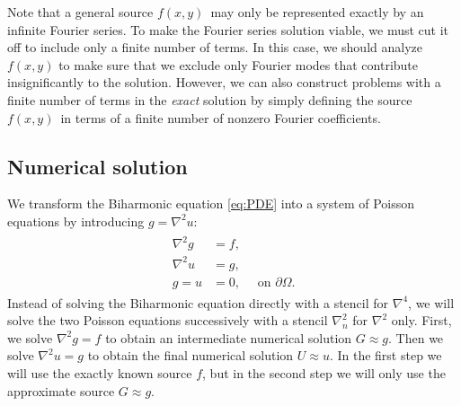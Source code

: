 Note that a general source $f(x,y)$ may only be represented exactly by an infinite Fourier series.
To make the Fourier series solution viable, we must cut it off to include only a finite number of terms.
In this case, we should analyze $f(x,y)$ to make sure that we exclude only Fourier modes that contribute insignificantly to the solution.
However, we can also construct problems with a finite number of terms in the \emph{exact} solution by simply defining the source $f(x,y)$ in terms of a finite number of nonzero Fourier coefficients.


\subsection{Numerical solution}
\label{sec:pde:numerical_solution}

We transform the Biharmonic equation \ref{eq:PDE} into a system of Poisson equations by introducing $g = \nabla^2 u$:
\begin{align}\label{eq:PDE-poisson}
  \begin{split}
    \nabla^2g &= f,\\
    \nabla^2u &= g,\\
    g = u &= 0,\quad \text{ on } \partial \Omega.
  \end{split}
\end{align}
Instead of solving the Biharmonic equation directly with a stencil for $\nabla^4$, we will solve the two Poisson equations successively with a stencil $\nabla_n^2$ for $\nabla^2$ only.
First, we solve $\nabla^2 g = f$ to obtain an intermediate numerical solution $G \approx g$.
Then we solve $\nabla^2 u = g$ to obtain the final numerical solution $U \approx u$.
In the first step we will use the exactly known source $f$, but in the second step we will only use the approximate source $G \approx g$.

